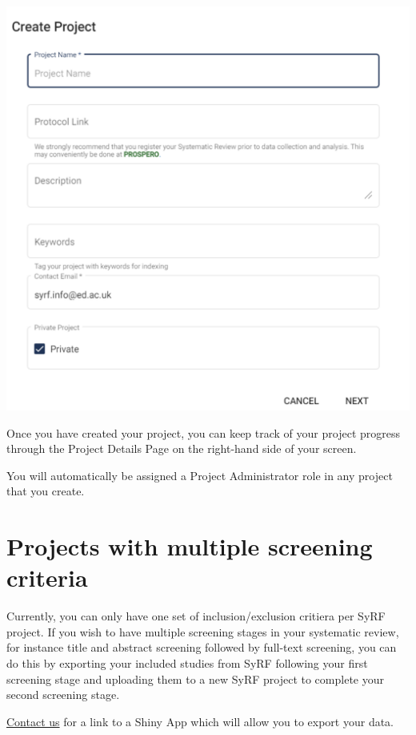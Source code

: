 \documentclass[
]{book}
\begin{document}
\includegraphics[width=1\textwidth,height=1\textheight]{figs/Fig_Create_a_project.png}

Once you have created your project, you can keep track of your project progress through the Project Details Page on the right-hand side of your screen.

You will automatically be assigned a Project Administrator role in any project that you create.

\hypertarget{projects-with-multiple-screening-criteria}{%
\section{Projects with multiple screening criteria}\label{projects-with-multiple-screening-criteria}}

Currently, you can only have one set of inclusion/exclusion critiera per SyRF project. If you wish to have multiple screening stages in your systematic review, for instance title and abstract screening followed by full-text screening, you can do this by exporting your included studies from SyRF following your first screening stage and uploading them to a new SyRF project to complete your second screening stage.

\href{mailto:syrf.info@ed.ac.uk}{Contact us} for a link to a Shiny App which will allow you to export your data.
\end{document}
